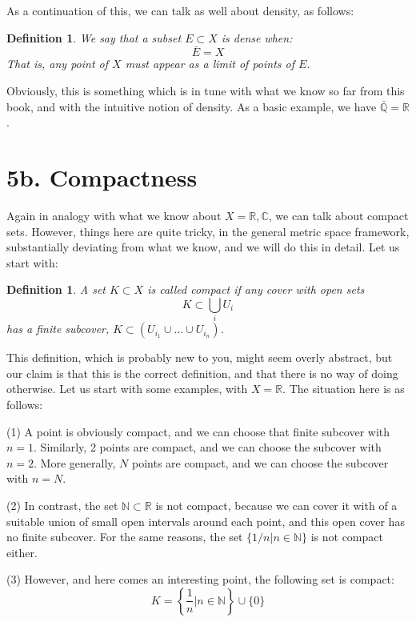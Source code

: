 \documentclass[12pt]{amsbook}
\newtheorem{definition}[theorem]{Definition}
\begin{document}
As a continuation of this, we can talk as well about density, as follows:

\begin{definition}
We say that a subset $E\subset X$ is dense when:
$$\bar{E}=X$$
That is, any point of $X$ must appear as a limit of points of $E$.
\end{definition}

Obviously, this is something which is in tune with what we know so far from this book, and with the intuitive notion of density. As a basic example, we have $\bar{\mathbb Q}=\mathbb R$.

\section*{5b. Compactness}

Again in analogy with what we know about $X=\mathbb R,\mathbb C$, we can talk about compact sets. However, things here are quite tricky, in the general metric space framework, substantially deviating from what we know, and we will do this in detail. Let us start with:

\begin{definition}
A set $K\subset X$ is called compact if any cover with open sets
$$K\subset\bigcup_iU_i$$
has a finite subcover, $K\subset(U_{i_1}\cup\ldots\cup U_{i_n})$.
\end{definition}

This definition, which is probably new to you, might seem overly abstract, but our claim is that this is the correct definition, and that there is no way of doing otherwise. Let us start with some examples, with $X=\mathbb R$. The situation here is as follows:

\bigskip

(1) A point is obviously compact, and we can choose that finite subcover with $n=1$. Similarly, 2 points are compact, and we can choose the subcover with $n=2$. More generally, $N$ points are compact, and we can choose the subcover with $n=N$.

\bigskip

(2) In contrast, the set $\mathbb N\subset\mathbb R$ is not compact, because we can cover it with of a suitable union of small open intervals around each point, and this open cover has no finite subcover. For the same reasons, the set $\{1/n|n\in\mathbb N\}$ is not compact either.

\bigskip

(3) However, and here comes an interesting point, the following set is compact:
$$K=\left\{\frac{1}{n}\Big|n\in\mathbb N\right\}\cup\{0\}$$
\end{document}
